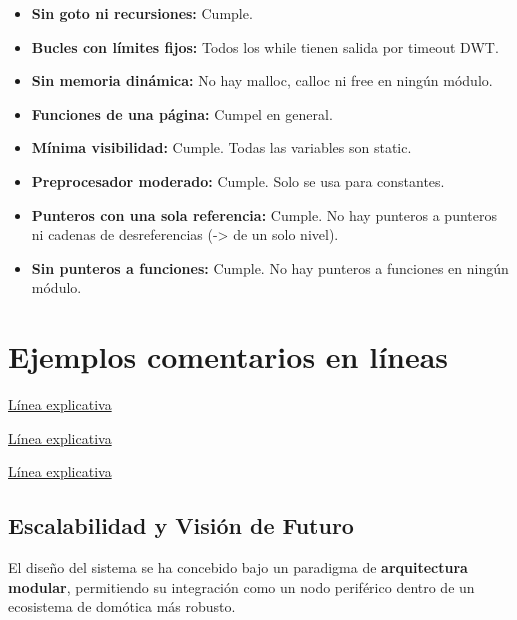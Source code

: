 \documentclass[12pt,a4paper]{article}
\begin{document}
\begin{itemize}
	\item \textbf{Sin goto ni recursiones: }Cumple.
	\item \textbf{Bucles con límites fijos: }Todos los while tienen salida por  timeout DWT.
	\item \textbf{Sin memoria dinámica:} No hay malloc, calloc ni free en ningún módulo.
	\item \textbf{Funciones de una página:} Cumpel en general. 
	\item \textbf{Mínima visibilidad:} Cumple. Todas las variables son static.
	\item \textbf{Preprocesador moderado:} Cumple. Solo se usa para constantes.
	\item \textbf{Punteros con una sola referencia:} Cumple. No hay punteros a punteros ni cadenas de desreferencias (-> de un solo nivel).
	\item \textbf{Sin punteros a funciones:} Cumple. No hay punteros a funciones en ningún módulo.
\end{itemize}

\section{Ejemplos comentarios en líneas}

\href{https://github.com/matutecno/PdM_workspace_Matias_Morales/blob/36632c7629ba2d8375b50d48365e32dbffeaf255/TPF/Master_0/Master_0/STM32CubeIDE/Drivers/API/Src/API_parser.c#L58}{Línea explicativa}

\href{https://github.com/matutecno/PdM_workspace_Matias_Morales/blob/36632c7629ba2d8375b50d48365e32dbffeaf255/TPF/Master_0/Master_0/STM32CubeIDE/Drivers/API/Src/API_parser.c#L46}{Línea explicativa}

\href{https://github.com/matutecno/PdM_workspace_Matias_Morales/blob/36632c7629ba2d8375b50d48365e32dbffeaf255/TPF/Master_0/Master_0/STM32CubeIDE/Drivers/API/Src/API_display.c#L18}{Línea explicativa}

\subsection{Escalabilidad y Visión de Futuro}

El diseño del sistema se ha concebido bajo un paradigma de \textbf{arquitectura modular}, permitiendo su integración como un nodo periférico dentro de un ecosistema de domótica más robusto. 
\end{document}
